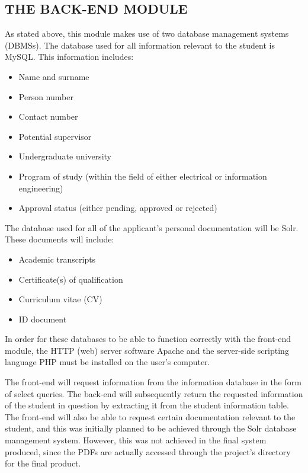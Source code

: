 \documentclass[journal,comsoc,onecolumn]{IEEEtran}
\begin{document}
\newpage

\subsection{THE BACK-END MODULE}

As stated above, this module makes use of two database management systems (DBMSs). The database used for all information relevant to the student is MySQL. This information includes:

\begin{itemize}
	\item Name and surname
	\item Person number
	\item Contact number
	\item Potential supervisor
	\item Undergraduate university
	\item Program of study (within the field of either electrical or information engineering)
	\item Approval status (either pending, approved or rejected)
\end{itemize}

\hfill \break The database used for all of the applicant's personal documentation will be Solr. These documents will include:

\begin{itemize}
	\item Academic transcripts
	\item Certificate(s) of qualification
	\item Curriculum vitae (CV)
	\item ID document
\end{itemize}

\hfill \break In order for these databases to be able to function correctly with the front-end module, the HTTP (web) server software Apache and the server-side scripting language PHP must be installed on the user's computer.

\hfill \break The front-end will request information from the information database in the form of select queries. The back-end will subsequently return the requested information of the student in question by extracting it from the student information table. The front-end will also be able to request certain documentation relevant to the student, and this was initially planned to be achieved through the Solr database management system. However, this was not achieved in the final system produced, since the PDFs are actually accessed through the project's directory for the final product.
\end{document}
